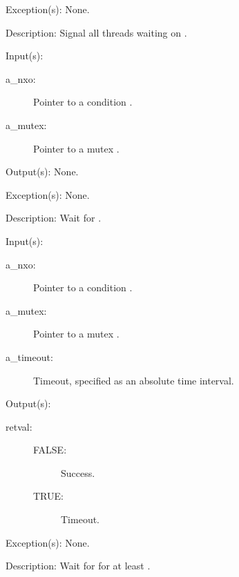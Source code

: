 \begin{capi}
\begin{capilist}
	\item[Exception(s): ] None.
	\item[Description: ]
		Signal all threads waiting on .
	\end{capilist}
\label{nxo_condition_wait}
	\begin{capilist}
	\item[Input(s): ]
		\begin{description}\item[]
		\item[a\_nxo: ]
			Pointer to a condition .
		\item[a\_mutex: ]
			Pointer to a mutex .
		\end{description}
	\item[Output(s): ] None.
	\item[Exception(s): ] None.
	\item[Description: ]
		Wait for .
	\end{capilist}
\label{nxo_condition_timedwait}
	\begin{capilist}
	\item[Input(s): ]
		\begin{description}\item[]
		\item[a\_nxo: ]
			Pointer to a condition \classname{nxo}.
		\item[a\_mutex: ]
			Pointer to a mutex \classname{nxo}.
		\item[a\_timeout: ]
			Timeout, specified as an absolute time interval.
		\end{description}
	\item[Output(s): ]
		\begin{description}\item[]
		\item[retval: ]
			\begin{description}\item[]
			\item[FALSE: ] Success.
			\item[TRUE: ] Timeout.
			\end{description}
		\end{description}
	\item[Exception(s): ] None.
	\item[Description: ]
		Wait for  for at least \cvar{a\_timeout}.
	\end{capilist}
\end{capi}
